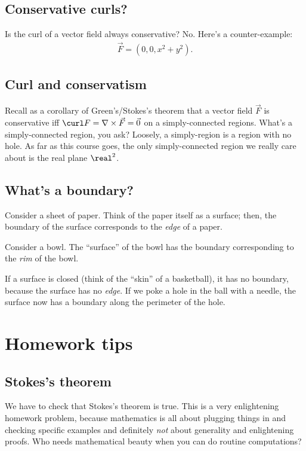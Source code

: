 \documentclass{multi}
\begin{document}
\subsection*{Conservative curls?}

Is the curl of a vector field always conservative?  No.  Here's a
counter-example:
\begin{gather*}
  \vec F = (0, 0, x^2 + y^2).
\end{gather*}


\subsection*{Curl and conservatism}

Recall as a corollary of Green's/Stokes's theorem that a vector field \(\vec F\)
is conservative iff \(\curl F = \nabla \times \vec F = \vec 0\) on a
simply-connected regions.  What's a simply-connected region, you ask?  Loosely,
a simply-region is a region with no hole.  As far as this course goes, the only
simply-connected region we really care about is the real plane \(\real^2\).

\subsection*{What's a boundary?}

Consider a sheet of paper.  Think of the paper itself as a surface; then, the
boundary of the surface corresponds to the \emph{edge} of a paper.

Consider a bowl.  The ``surface'' of the bowl has the boundary corresponding to
the \emph{rim} of the bowl.

If a surface is closed (think of the ``skin'' of a basketball), it has no
boundary, because the surface has no \emph{edge}.  If we poke a hole in the ball
with a needle, the surface now has a boundary along the perimeter of the hole.



\section*{Homework tips}

\subsection*{Stokes's theorem}

We have to check that Stokes's theorem is true.  This is a very enlightening
homework problem, because mathematics is all about plugging things in and
checking specific examples and definitely \emph{not} about generality and
enlightening proofs.  Who needs mathematical beauty when you can do routine
computations?
\end{document}
